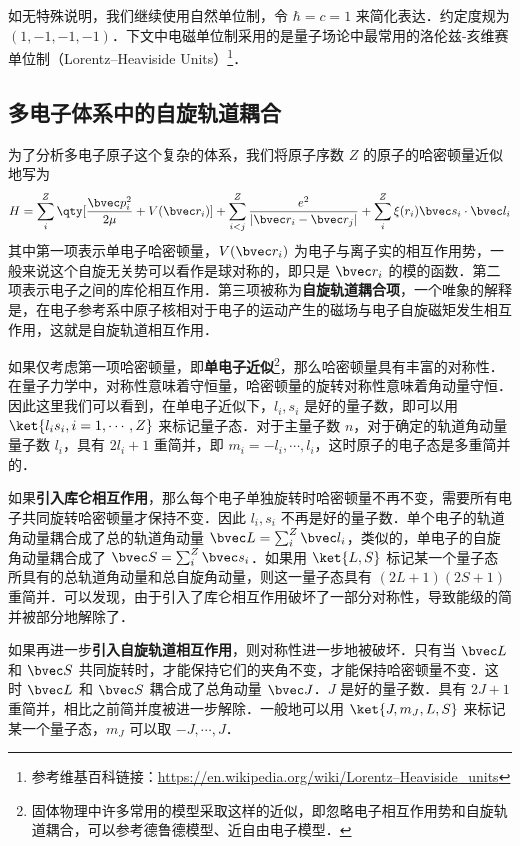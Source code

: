

如无特殊说明，我们继续使用自然单位制，令 $\hbar=c=1$ 来简化表达．约定度规为 $(1,-1,-1,-1)$．下文中电磁单位制采用的是量子场论中最常用的洛伦兹-亥维赛单位制（Lorentz–Heaviside Units）\footnote{参考维基百科链接：\href{https://en.wikipedia.org/wiki/Lorentz–Heaviside_units}{https://en.wikipedia.org/wiki/Lorentz–Heaviside_units}}．


\subsection{多电子体系中的自旋轨道耦合}
\cite{黄昆}为了分析多电子原子这个复杂的体系，我们将原子序数 $Z$ 的原子的哈密顿量近似地写为
\begin{equation}
H=\sum_{i}^{Z} \qty[\frac{\bvec p_i^2}{2\mu} +V(\bvec r_i)]+\sum_{i<j}^Z \frac{e^2}{|\bvec r_i-\bvec r_j|}+\sum_i^Z \xi(r_i)\bvec s_i\cdot \bvec l_i
\end{equation}
其中第一项表示单电子哈密顿量，$V(\bvec r_i)$ 为电子与离子实的相互作用势，一般来说这个自旋无关势可以看作是球对称的，即只是 $\bvec r_i$ 的模的函数．第二项表示电子之间的库伦相互作用．第三项被称为\textbf{自旋轨道耦合项}，一个唯象的解释是，在电子参考系中原子核相对于电子的运动产生的磁场与电子自旋磁矩发生相互作用，这就是自旋轨道相互作用．

如果仅考虑第一项哈密顿量，即\textbf{单电子近似}\footnote{固体物理中许多常用的模型采取这样的近似，即忽略电子相互作用势和自旋轨道耦合，可以参考德鲁德模型、近自由电子模型．}，那么哈密顿量具有丰富的对称性．在量子力学中，对称性意味着守恒量，哈密顿量的旋转对称性意味着角动量守恒．因此这里我们可以看到，在单电子近似下，$l_i,s_i$ 是好的量子数，即可以用 $\ket{l_is_i,i=1,\cdots,Z}$ 来标记量子态．对于主量子数 $n$，对于确定的轨道角动量量子数 $l_i$，具有 $2 l_i+1$ 重简并，即 $m_{i}=-l_i,\cdots,l_i$，这时原子的电子态是多重简并的．

如果\textbf{引入库仑相互作用}，那么每个电子单独旋转时哈密顿量不再不变，需要所有电子共同旋转哈密顿量才保持不变．因此 $l_i,s_i$ 不再是好的量子数．单个电子的轨道角动量耦合成了总的轨道角动量 $\bvec L=\sum_i^Z \bvec l_i$，类似的，单电子的自旋角动量耦合成了 $\bvec S=\sum_i^Z \bvec s_i$．如果用 $\ket{L,S}$ 标记某一个量子态所具有的总轨道角动量和总自旋角动量，则这一量子态具有 $(2L+1)(2S+1)$ 重简并．可以发现，由于引入了库仑相互作用破坏了一部分对称性，导致能级的简并被部分地解除了．

如果再进一步\textbf{引入自旋轨道相互作用}，则对称性进一步地被破坏．只有当 $\bvec L$ 和 $\bvec S$ 共同旋转时，才能保持它们的夹角不变，才能保持哈密顿量不变．这时 $\bvec L$ 和 $\bvec S$ 耦合成了总角动量 $\bvec J$．$J$ 是好的量子数．具有 $2J+1$ 重简并，相比之前简并度被进一步解除．一般地可以用 $\ket{J,m_J,L,S}$ 来标记某一个量子态，$m_J$ 可以取 $-J,\cdots,J$．
